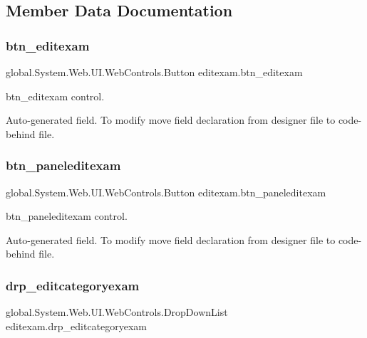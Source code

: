 \subsection{Member Data Documentation}
\mbox{\label{classeditexam_af43bf725760dc02599a8b089fac04cdd}} 
\subsubsection{\texorpdfstring{btn\_editexam}{btn\_editexam}}
{\footnotesize\ttfamily global.\+System.\+Web.\+U\+I.\+Web\+Controls.\+Button editexam.\+btn\+\_\+editexam\hspace{0.3cm}{\ttfamily [protected]}}



btn\+\_\+editexam control. 

Auto-\/generated field. To modify move field declaration from designer file to code-\/behind file. \mbox{\label{classeditexam_a54ba3200312bd500f9185a8ded98c922}} 
\subsubsection{\texorpdfstring{btn\_paneleditexam}{btn\_paneleditexam}}
{\footnotesize\ttfamily global.\+System.\+Web.\+U\+I.\+Web\+Controls.\+Button editexam.\+btn\+\_\+paneleditexam\hspace{0.3cm}{\ttfamily [protected]}}



btn\+\_\+paneleditexam control. 

Auto-\/generated field. To modify move field declaration from designer file to code-\/behind file. \mbox{\label{classeditexam_aa671e694b3dbf5bb08d5ed594ab4894b}} 
\subsubsection{\texorpdfstring{drp\_editcategoryexam}{drp\_editcategoryexam}}
{\footnotesize\ttfamily global.\+System.\+Web.\+U\+I.\+Web\+Controls.\+Drop\+Down\+List editexam.\+drp\+\_\+editcategoryexam\hspace{0.3cm}{\ttfamily [protected]}}



